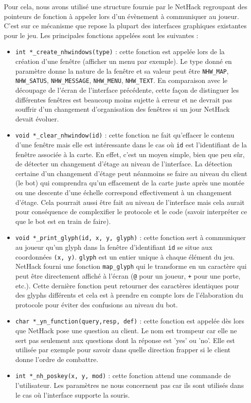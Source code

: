 \documentclass[a4paper,12pt]{article}
\begin{document}
Pour cela, nous avons utilisé une structure fournie par le NetHack regroupant des pointeurs de fonction à appeler lors d'un évènement à communiquer au joueur. C'est sur ce mécanisme que repose la plupart des interfaces graphiques existantes pour le jeu. Les principales fonctions appelées sont les suivantes :
\begin{itemize}
	\item \verb!int *_create_nhwindows(type)! : cette fonction est appelée lors de la création d'une fenêtre (afficher un menu par exemple). Le type donné en paramètre donne la nature de la fenêtre et sa valeur peut être \verb!NHW_MAP!, \verb!NHW_SATUS!, \verb!NHW_MESSAGE!, \verb!NHW_MENU!, \verb!NHW_TEXT!. En comparaison avec le découpage de l'écran de l'interface précédente, cette façon de distinguer les différentes fenêtres est beaucoup moins sujette à erreur et ne devrait pas souffrir d'un changement d'organisation des fenêtres si un jour NetHack devait évoluer.
	\item \verb!void *_clear_nhwindow(id)! : cette fonction ne fait qu'effacer le contenu d'une fenêtre mais elle est intéressante dans le cas où \verb!id! est l'identifiant de la fenêtre associée à la carte. En effet, c'est un moyen simple, bien que peu sûr, de détecter un changement d'étage au niveau de l'interface. La détection certaine d'un changement d'étage peut néanmoins se faire au niveau du client (le bot) qui comprendra qu'un effacement de la carte juste après une montée ou une descente d'une échelle correspond effectivement à un changement d'étage. Cela pourrait aussi être fait au niveau de l'interface mais cela aurait pour conséquence de complexifier le protocole et le code (savoir interpréter ce que le bot est en train de faire).
	\item \verb!void *_print_glyph(id, x, y, glyph)! : cette fonction sert à communiquer au joueur qu'un glyph dans la fenêtre d'identifiant \verb!id! se situe aux coordonnées \verb!(x, y)!. \verb!glyph! est un entier unique à chaque élément du jeu. NetHack fourni une fonction \verb!map_glyph! qui le transforme en un caractère qui peut être directement affiché à l'écran (\verb!@! pour un joueur, \verb!+! pour une porte, etc.). Cette dernière fonction peut retourner des caractères identiques pour des glyphs différents et cela est à prendre en compte lors de l'élaboration du protocole pour éviter des confusions au niveau du bot.
	\item \verb!char *_yn_function(query,resp, def)! : cette fonction est appelée dès lors que NetHack pose une question au client. Le nom est trompeur car elle ne sert pas seulement aux questions dont la réponse est 'yes' ou 'no'. Elle est utilisée par exemple pour savoir dans quelle direction frapper si le client donne l'ordre de combattre.
	\item \verb!int *_nh_poskey(x, y, mod)! : cette fonction attend une commande de l'utilisateur. Les paramètres ne nous concernent pas car ils sont utilisés dans le cas où l'interface supporte la souris.
\end{itemize}
\end{document}

